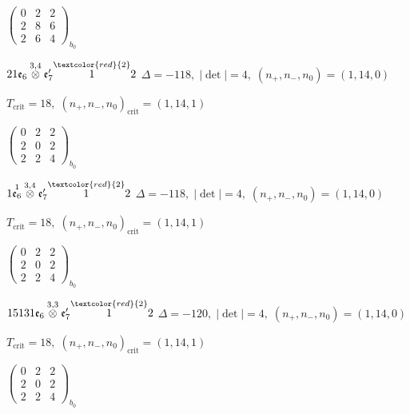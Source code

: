 \documentclass[10pt]{article}
\begin{document}
\hspace{2em}$\left(\begin{smallmatrix}0 & 2 & 2 \\ 2 & 8 & 6 \\ 2 & 6 & 4\end{smallmatrix}\right)_{\!b_0}$

$21\mathfrak{e}_6\overset{3,4}{\otimes}\mathfrak{e}_7'\overset{\textcolor{red}{2}}{1}2$ \quad $\Delta=-118,\; |\det|=4,\; (n_+,n_-,n_0)=(1,14,0)$

\hspace{1em}$T_{\text{crit}}=18,\; (n_+,n_-,n_0)_{\text{crit}}=(1,14,1)$

\hspace{2em}$\left(\begin{smallmatrix}0 & 2 & 2 \\ 2 & 0 & 2 \\ 2 & 2 & 4\end{smallmatrix}\right)_{\!b_0}$

\smallskip

$1\overset{1}{\mathfrak{e}_6}\overset{3,4}{\otimes}\mathfrak{e}_7'\overset{\textcolor{red}{2}}{1}2$ \quad $\Delta=-118,\; |\det|=4,\; (n_+,n_-,n_0)=(1,14,0)$

\hspace{1em}$T_{\text{crit}}=18,\; (n_+,n_-,n_0)_{\text{crit}}=(1,14,1)$

\hspace{2em}$\left(\begin{smallmatrix}0 & 2 & 2 \\ 2 & 0 & 2 \\ 2 & 2 & 4\end{smallmatrix}\right)_{\!b_0}$

\smallskip

$15131\mathfrak{e}_6\overset{3,3}{\otimes}\mathfrak{e}_7'\overset{\textcolor{red}{2}}{1}2$ \quad $\Delta=-120,\; |\det|=4,\; (n_+,n_-,n_0)=(1,14,0)$

\hspace{1em}$T_{\text{crit}}=18,\; (n_+,n_-,n_0)_{\text{crit}}=(1,14,1)$

\hspace{2em}$\left(\begin{smallmatrix}0 & 2 & 2 \\ 2 & 0 & 2 \\ 2 & 2 & 4\end{smallmatrix}\right)_{\!b_0}$
\end{document}
